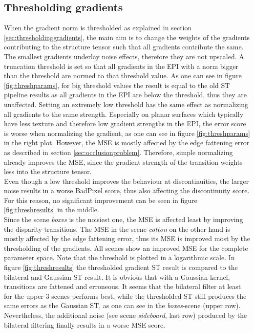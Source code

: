 \documentclass  [
  paper    = a4,
  BCOR     = 10mm,
  twoside,
  fontsize = 12pt,
  fleqn,
  toc      = bibnumbered,
  toc      = listofnumbered,
  numbers  = noendperiod,
  headings = normal,
  listof   = leveldown,
  version  = 3.03
]                                       {scrreprt}
\begin{document}
\subsection{Thresholding gradients}
\label{sec:ev_thresh}
When the gradient norm is thresholded as explained in section \ref{sec:thresholdinggradients}, the main aim is to change the weights of the gradients contributing to the structure tensor such that all gradients contribute the same. The smallest gradients underlay noise effects, therefore they are not upscaled. A truncation threshold is set so that all gradients in the EPI with a norm bigger than the threshold are normed to that threshold value. As one can see in figure \ref{fig:threshparams}, for big threshold values the result is equal to the old ST pipeline results as all gradients in the EPI are below the threshold, thus they are unaffected. Setting an extremely low threshold has the same effect as normalizing all gradients to the same strength. Especially on planar surfaces which typically have less texture and therefore low gradient strengths in the EPI, the error score is worse when normalizing the gradient, as one can see in figure \ref{fig:threshparams} in the right plot. However, the MSE is mostly affected by the edge fattening error as described in section \ref{sec:occlusionproblem}. Therefore, simple normalizing already improves the MSE, since the gradient strength of the transition weights less into the structure tensor. \\
Even though a low threshold improves the behaviour at discontinuities, the larger noise results in a worse BadPixel score, thus also affecting the discontinuity score. For this reason, no significant improvement can be seen in figure \ref{fig:threshresults} in the middle.\\
Since the scene \textit{boxes} is the noisiest one, the MSE is affected least by improving the disparity transitions. The MSE in the scene \textit{cotton} on the other hand is mostly affected by the edge fattening error, thus its MSE is improved most by the thresholding of the gradients. All scenes show an improved MSE for the complete parameter space. Note that the threshold is plotted in a logarithmic scale. In figure \ref{fig:threshresults} the thresholded gradient ST result is compared to the bilateral and Gaussian ST result. It is obvious that with a Gaussian kernel, transitions are fattened and erroneous. It seems that the bilateral filter at least for the upper 3 scenes performs best, while the thresholded ST still produces the same errors as the Gaussian ST, as one can see in the \textit{boxes}-scene (upper row). Nevertheless, the additional noise (see scene \textit{sideboard}, last row) produced by the bilateral filtering finally results in a worse MSE score. 
\end{document}
